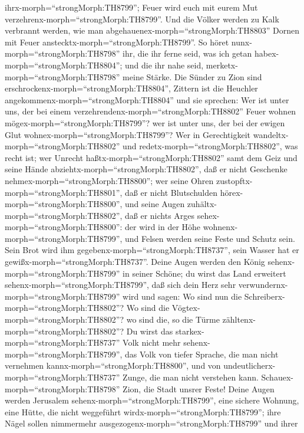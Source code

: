 ihrx-morph=``strongMorph:TH8799''; Feuer wird euch mit eurem Mut
verzehrenx-morph=``strongMorph:TH8799''.  Und die Völker
werden zu Kalk verbrannt werden, wie man
abgehauenex-morph=``strongMorph:TH8803'' Dornen mit Feuer
anstecktx-morph=``strongMorph:TH8799''.  So höret
nunx-morph=``strongMorph:TH8798'' ihr, die ihr ferne seid, was ich getan
habex-morph=``strongMorph:TH8804''; und die ihr nahe seid,
merketx-morph=``strongMorph:TH8798'' meine Stärke.  Die
Sünder zu Zion sind erschrockenx-morph=``strongMorph:TH8804'', Zittern
ist die Heuchler angekommenx-morph=``strongMorph:TH8804'' und sie
sprechen: Wer ist unter uns, der bei einem
verzehrendenx-morph=``strongMorph:TH8802'' Feuer wohnen
mögex-morph=``strongMorph:TH8799''? wer ist unter uns, der bei der
ewigen Glut wohnex-morph=``strongMorph:TH8799''?  Wer in
Gerechtigkeit wandeltx-morph=``strongMorph:TH8802'' und
redetx-morph=``strongMorph:TH8802'', was recht ist; wer Unrecht
haßtx-morph=``strongMorph:TH8802'' samt dem Geiz und seine Hände
abziehtx-morph=``strongMorph:TH8802'', daß er nicht Geschenke
nehmex-morph=``strongMorph:TH8800''; wer seine Ohren
zustopftx-morph=``strongMorph:TH8801'', daß er nicht Blutschulden
hörex-morph=``strongMorph:TH8800'', und seine Augen
zuhältx-morph=``strongMorph:TH8802'', daß er nichts Arges
sehex-morph=``strongMorph:TH8800'':  der wird in der Höhe
wohnenx-morph=``strongMorph:TH8799'', und Felsen werden seine Feste und
Schutz sein. Sein Brot wird ihm gegebenx-morph=``strongMorph:TH8737'',
sein Wasser hat er gewißx-morph=``strongMorph:TH8737''. 
Deine Augen werden den König sehenx-morph=``strongMorph:TH8799'' in
seiner Schöne; du wirst das Land erweitert
sehenx-morph=``strongMorph:TH8799'',  daß sich dein Herz
sehr verwundernx-morph=``strongMorph:TH8799'' wird und sagen: Wo sind
nun die Schreiberx-morph=``strongMorph:TH8802''? Wo sind die
Vögtex-morph=``strongMorph:TH8802''? wo sind die, so die Türme
zähltenx-morph=``strongMorph:TH8802''?  Du wirst das
starkex-morph=``strongMorph:TH8737'' Volk nicht mehr
sehenx-morph=``strongMorph:TH8799'', das Volk von tiefer Sprache, die
man nicht vernehmen kannx-morph=``strongMorph:TH8800'', und von
undeutlicherx-morph=``strongMorph:TH8737'' Zunge, die man nicht
verstehen kann.  Schauex-morph=``strongMorph:TH8798'' Zion,
die Stadt unsrer Feste! Deine Augen werden Jerusalem
sehenx-morph=``strongMorph:TH8799'', eine sichere Wohnung, eine Hütte,
die nicht weggeführt wirdx-morph=``strongMorph:TH8799''; ihre Nägel
sollen nimmermehr ausgezogenx-morph=``strongMorph:TH8799'' und ihrer
